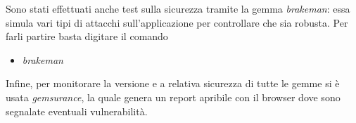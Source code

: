 \documentclass[Lau, binding=0.6cm, oneside]{sapthesis}
\begin{document}
Sono stati effettuati anche test sulla sicurezza tramite la gemma \textit{brakeman}: essa simula vari tipi di attacchi sull'applicazione per controllare che sia robusta. Per farli partire basta digitare il comando 
\begin{itemize}
	\item \textit{brakeman}
\end{itemize}

Infine, per monitorare la versione e a relativa sicurezza di tutte le gemme si è usata \textit{gemsurance}, la quale genera un report apribile con il browser dove sono segnalate eventuali vulnerabilità. 

\backmatter
\cleardoublepage
\nocite{*}
\end{document}
